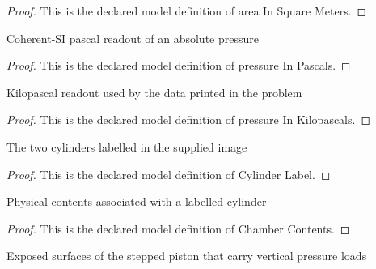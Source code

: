 \begin{proof}
  This is the declared model definition of area In Square Meters.
\end{proof}
\begin{definition}
  \label{def:physics:phyx-mini-0395:phyxminiproblems-problemphyxmini0395-pressureinpascals}
  Coherent-SI pascal readout of an absolute pressure
\end{definition}
\begin{proof}
  This is the declared model definition of pressure In Pascals.
\end{proof}
\begin{definition}
  \label{def:physics:phyx-mini-0395:phyxminiproblems-problemphyxmini0395-pressureinkilopascals}
  Kilopascal readout used by the data printed in the problem
\end{definition}
\begin{proof}
  This is the declared model definition of pressure In Kilopascals.
\end{proof}
\begin{definition}
  \label{def:physics:phyx-mini-0395:phyxminiproblems-problemphyxmini0395-cylinderlabel}
  The two cylinders labelled in the supplied image
\end{definition}
\begin{proof}
  This is the declared model definition of Cylinder Label.
\end{proof}
\begin{definition}
  \label{def:physics:phyx-mini-0395:phyxminiproblems-problemphyxmini0395-chambercontents}
  Physical contents associated with a labelled cylinder
\end{definition}
\begin{proof}
  This is the declared model definition of Chamber Contents.
\end{proof}
\begin{definition}
  \label{def:physics:phyx-mini-0395:phyxminiproblems-problemphyxmini0395-pistonsurface}
  Exposed surfaces of the stepped piston that carry vertical pressure loads
\end{definition}
